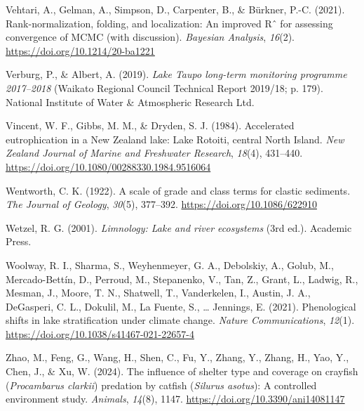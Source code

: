 \documentclass[
  letterpaper,
  DIV=11,
  numbers=noendperiod]{scrartcl}
\newlength{\cslhangindent}
\newenvironment{CSLReferences}[2] %
 {\begin{list}{}{%
  \setlength{\itemindent}{0pt}
  \setlength{\leftmargin}{0pt}
  \setlength{\parsep}{0pt}
  \ifodd #1
   \setlength{\leftmargin}{\cslhangindent}
   \setlength{\itemindent}{-1\cslhangindent}
  \fi
  \setlength{\itemsep}{#2\baselineskip}}}
 {\end{list}}
\begin{document}
\begin{CSLReferences}{1}{0}
Vehtari, A., Gelman, A., Simpson, D., Carpenter, B., \& Bürkner, P.-C.
(2021). Rank-normalization, folding, and localization: An improved Rˆ
for assessing convergence of MCMC (with discussion). \emph{Bayesian
Analysis}, \emph{16}(2). \url{https://doi.org/10.1214/20-ba1221}

Verburg, P., \& Albert, A. (2019). \emph{{Lake Taupo} long-term
monitoring programme 2017--2018} (Waikato Regional Council Technical
Report 2019/18; p. 179). National Institute of Water \& Atmospheric
Research Ltd.

Vincent, W. F., Gibbs, M. M., \& Dryden, S. J. (1984). Accelerated
eutrophication in a {New Zealand} lake: {Lake Rotoiti}, central {North
Island}. \emph{New Zealand Journal of Marine and Freshwater Research},
\emph{18}(4), 431--440.
\url{https://doi.org/10.1080/00288330.1984.9516064}

Wentworth, C. K. (1922). A scale of grade and class terms for clastic
sediments. \emph{The Journal of Geology}, \emph{30}(5), 377--392.
\url{https://doi.org/10.1086/622910}

Wetzel, R. G. (2001). \emph{Limnology: Lake and river ecosystems} (3rd
ed.). Academic Press.

Woolway, R. I., Sharma, S., Weyhenmeyer, G. A., Debolskiy, A., Golub,
M., Mercado-Bettín, D., Perroud, M., Stepanenko, V., Tan, Z., Grant, L.,
Ladwig, R., Mesman, J., Moore, T. N., Shatwell, T., Vanderkelen, I.,
Austin, J. A., DeGasperi, C. L., Dokulil, M., La Fuente, S., \ldots{}
Jennings, E. (2021). Phenological shifts in lake stratification under
climate change. \emph{Nature Communications}, \emph{12}(1).
\url{https://doi.org/10.1038/s41467-021-22657-4}

Zhao, M., Feng, G., Wang, H., Shen, C., Fu, Y., Zhang, Y., Zhang, H.,
Yao, Y., Chen, J., \& Xu, W. (2024). The influence of shelter type and
coverage on crayfish ({\emph{Procambarus clarkii}}) predation by catfish
({\emph{Silurus asotus}}): A controlled environment study.
\emph{Animals}, \emph{14}(8), 1147.
\url{https://doi.org/10.3390/ani14081147}

\end{CSLReferences}
\end{document}
